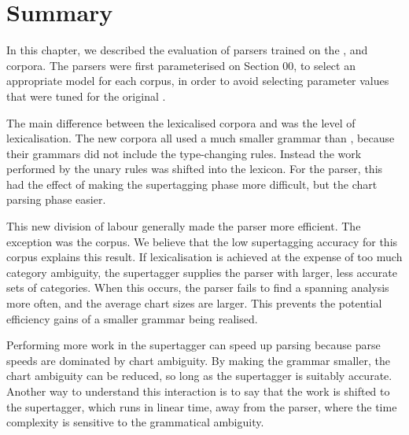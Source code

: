 \section{Summary}

In this chapter, we described the evaluation of parsers trained on the \hatsys,
\nounary and \trsys corpora. The parsers were first parameterised on Section 00,
to select an appropriate model for each corpus, in order to avoid selecting
parameter values that were tuned for the original \ccgbank.

The main difference between the lexicalised corpora and \ccgbank was the level
of lexicalisation. The new corpora all used a much smaller grammar than
\ccgbank, because their grammars did not include the \ccgbank type-changing rules.
Instead the work performed by the unary rules was shifted into the lexicon. For
the \candc parser, this had the effect of making the supertagging phase more
difficult, but the chart parsing phase easier.

This new division of labour generally made the parser more efficient. The
exception was the \nounary corpus. We believe that the low supertagging accuracy
for this corpus explains this result. If lexicalisation is achieved at the
expense of too much category ambiguity, the supertagger supplies the parser with
larger, less accurate sets of categories. When this occurs, the parser fails to
find a spanning analysis more often, and the average chart sizes are larger.
This prevents the potential efficiency gains of a smaller grammar being
realised.

Performing more work in the supertagger can speed up parsing because parse
speeds are dominated by chart ambiguity. By making the grammar smaller, the
chart ambiguity can be reduced, so long as the supertagger is suitably accurate.
Another way to understand this interaction is to say that the work is shifted to
the supertagger, which runs in linear time, away from the parser, where the time
complexity is sensitive to the grammatical ambiguity.



